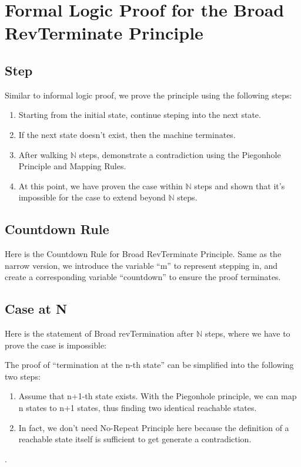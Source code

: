 \section{Formal Logic Proof for the Broad RevTerminate Principle}

\subsection{ Step }


Similar to informal logic proof, we prove the principle using the following steps:
\begin{enumerate}[1.]
    \item Starting from the initial state, continue steping into the next state.
    \item If the next state doesn't exist, then the machine terminates.
    \item After walking $\mathbb{N}$ steps, demonstrate a contradiction using the Piegonhole Principle and Mapping Rules.
    \item At this point, we have proven the case within $\mathbb{N}$ steps and shown that it's impossible for the case to extend beyond $\mathbb{N}$ steps.
\end{enumerate}

\subsection{ Countdown Rule }
Here is the Countdown Rule for Broad RevTerminate Principle.
Same as the narrow version, we introduce the variable ``m'' to represent stepping in, and create a corresponding variable ``countdown'' to ensure the proof terminates.


\subsection{ Case at N }
Here is the statement of Broad revTermination after $\mathbb{N}$ steps, where we have to prove the case is impossible:


The proof of ``termination at the n-th state'' can be simplified into the following two steps:
\begin{enumerate}[1.]
    \item Assume that n+1-th state exists.  With the Piegonhole principle, we can map n states to n+1 states, thus finding two identical reachable states.
    \item In fact, we don't need No-Repeat Principle here because the definition of a reachable state itself is sufficient to get generate a contradiction.
\end{enumerate}.

